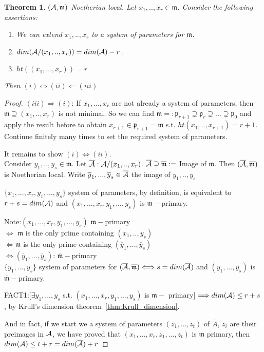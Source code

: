 \documentclass[11pt]{article}
\newtheorem{thm}{Theorem}[section]
\newcommand{\scm}{{\mathfrak m}}
\newcommand{\scp}{{\mathfrak p}}
\newcommand{\cala}{{\cal A}}
\newcommand{\Lrta}{\Longrightarrow}
\newcommand{\Llta}{\Longleftarrow}
\newcommand{\Llrta}{\Longleftrightarrow}
\begin{document}
\begin{thm}
$(\cala,\scm)$ Noetherian local. Let $x_1,..,x_r\in\scm$. Consider the following assertions:
\begin{enumerate}[label=(\roman*)]
\item We can extend $x_1,..,x_r$ to a system of parameters for $\scm$.
\item $dim(\cala/(x_1,..,x_r))=dim(\cala)-r$.
\item $ht((x_1,...,x_r))=r$
\end{enumerate}
Then $(i)\Llrta(ii)\Llta(iii)$
\end{thm}
\begin{proof}
$(iii)\Lrta(i)$: If $x_1,...,x_r$ are not already a system of parameters, then $\scm\supseteq(x_1,..,x_r)$ is not minimal. So we can find $\scm=:\scp_{r+1}\supsetneq \scp_r\supsetneq ...\supsetneq \scp_0$ and apply the result before to obtain $x_{r+1}\in\scp_{r+1}=\scm$ s.t. $ht(x_1,..,x_{r+1})=r+1$. Continue finitely many times to set the required system of parameters.

It remains to show $(i)\Llrta (ii)$. \\
Consider $y_1,..,y_s\in\scm$. Let $\overline{\cala}:\cala/(x_1,..,x_r)$. $\overline{\cala}\supseteq\overline{\scm}:=$ Image  of $\scm$. Then $(\overline{\cala},\overline{\scm})$ is Noetherian local. Write $\overline{y}_1,...,\overline{y}_s\in\overline{\cala}$ the image of $y_1,..,y_s$

$\{x_1,...,x_r,y_1,...,y_s\}$ system of parameters, by definition, is equivalent to $r+s=dim(\cala)$ and $(x_1,...,x_r,y_1,...,y_s)$ is $\scm-$primary.

Note:$(x_1,...,x_r,y_1,...,y_s)$ $\scm-$primary\\
$\Llrta$ $\scm$ is the only prime containing $(x_1,..,y_s)$\\
$\Llrta\overline{\scm}$ is the only prime containing $(\overline{y}_1,...,\overline{y}_s)$\\
$\Llrta(\overline{y}_1,...,\overline{y}_s)$: $\overline{\scm}-$primary\\
$\{\overline{y}_1,...,\overline{y}_s\}$ system of parameters for $(\overline{\cala},\overline{\scm})\Llrta s=dim(\overline{\cala})$ and $(\overline{y}_1,...,\overline{y}_s)$ is $\overline{\scm}-$primary.

FACT1:[$\exists y_1,...,y_s$ s.t. $(x_1,...,x_r,y_1,...,y_s)$ is $\scm-$ primary] $\Lrta dim(\cala)\leq r+s$, by Krull's dimension theorem~\ref{thm:Krull_dimension}.

And in fact, if we start we a system of parameters $(\overline{z}_1,...,\overline{z}_t)$ of $\overline{A}$, $z_i$ are their preimages in $\cala$, we have proved that $(x_1,...,x_r,z_1,...,z_t)$ is $\scm$ primary, then $dim(\cala)\leq t+r= dim(\overline{\cala})+r$


\end{proof}
\end{document}
